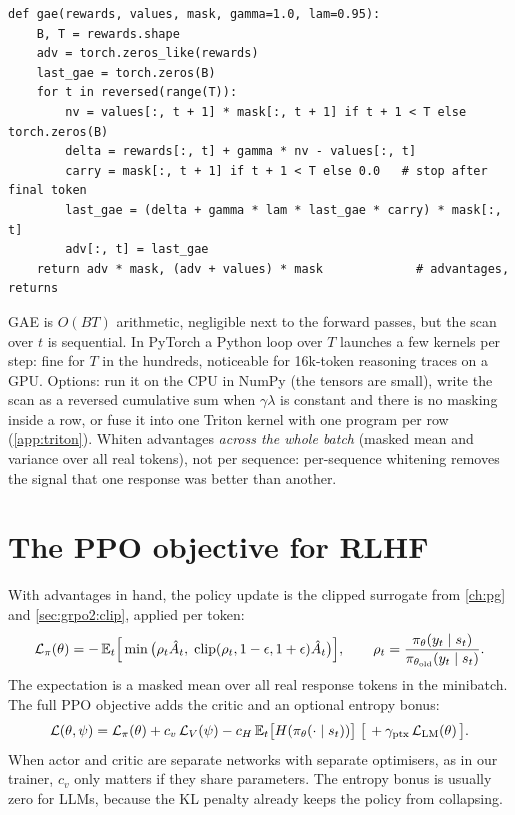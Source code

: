 \begin{lstlisting}[caption={GAE over right-padded responses (\ident{llmsys/rlhf/losses.py}).},label={lst:rlhf:gae}]
def gae(rewards, values, mask, gamma=1.0, lam=0.95):
    B, T = rewards.shape
    adv = torch.zeros_like(rewards)
    last_gae = torch.zeros(B)
    for t in reversed(range(T)):
        nv = values[:, t + 1] * mask[:, t + 1] if t + 1 < T else torch.zeros(B)
        delta = rewards[:, t] + gamma * nv - values[:, t]
        carry = mask[:, t + 1] if t + 1 < T else 0.0   # stop after final token
        last_gae = (delta + gamma * lam * last_gae * carry) * mask[:, t]
        adv[:, t] = last_gae
    return adv * mask, (adv + values) * mask             # advantages, returns
\end{lstlisting}

\begin{systemslens}
GAE is $O(BT)$ arithmetic, negligible next to the forward passes, but the scan over $t$ is
sequential. In PyTorch a Python loop over $T$ launches a few kernels per step: fine for $T$ in the
hundreds, noticeable for 16k-token reasoning traces on a GPU. Options: run it on the CPU in NumPy (the
tensors are small), write the scan as a reversed cumulative sum when $\gamma\lambda$ is constant and
there is no masking inside a row, or fuse it into one Triton kernel with one program per row
(\cref{app:triton}). Whiten advantages \emph{across the whole batch} (masked mean and variance over
all real tokens), not per sequence: per-sequence whitening removes the signal that one response was
better than another.
\end{systemslens}

\section{The PPO objective for RLHF}\label{sec:rlhf:ppo}

With advantages in hand, the policy update is the clipped surrogate from \cref{ch:pg} and
\cref{sec:grpo2:clip}, applied per token:
\begin{equation}
  \mathcal{L}_\pi(\theta) = -\,\mathbb{E}_t\Big[\min\big(\rho_t\hat A_t,\;
     \operatorname{clip}(\rho_t, 1-\epsilon, 1+\epsilon)\hat A_t\big)\Big],
  \qquad \rho_t = \frac{\pi_\theta(y_t\mid s_t)}{\pi_{\theta_{\text{old}}}(y_t\mid s_t)}.
  \label{eq:rlhf:clip}
\end{equation}
The expectation is a masked mean over all real response tokens in the minibatch. The full PPO
objective adds the critic and an optional entropy bonus:
\begin{equation}
  \mathcal{L}(\theta,\psi) = \mathcal{L}_\pi(\theta) + c_v\,\mathcal{L}_V(\psi) - c_H\,\mathbb{E}_t\big[H(\pi_\theta(\cdot\mid s_t))\big]
  \;\big[\, + \gamma_{\text{ptx}}\,\mathcal{L}_{\text{LM}}(\theta)\,\big].
  \label{eq:rlhf:total}
\end{equation}
When actor and critic are separate networks with separate optimisers, as in our trainer, $c_v$
only matters if they share parameters. The entropy bonus is usually zero for LLMs, because the KL
penalty already keeps the policy from collapsing.

